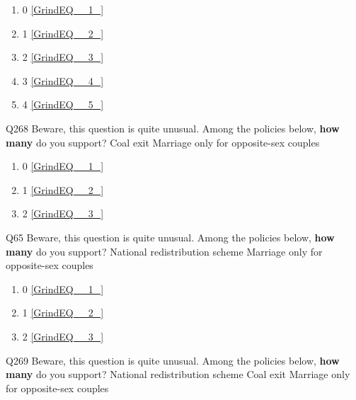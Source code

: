 \documentclass{article} %
\begin{document}
\begin{enumerate}
\item  0  \eqref{GrindEQ__1_} 

\item  1  \eqref{GrindEQ__2_} 

\item  2  \eqref{GrindEQ__3_} 

\item  3  \eqref{GrindEQ__4_} 

\item  4  \eqref{GrindEQ__5_} 
\end{enumerate}

\noindent 

\noindent 

\noindent 

\noindent Q268 Beware, this question is quite unusual. Among the policies below, \textbf{how many} do you support?   Coal exit  Marriage only for opposite-sex couples 

\begin{enumerate}
\item  0  \eqref{GrindEQ__1_} 

\item  1  \eqref{GrindEQ__2_} 

\item  2  \eqref{GrindEQ__3_} 
\end{enumerate}

\noindent 

\noindent 

\noindent 

\noindent Q65 Beware, this question is quite unusual. Among the policies below, \textbf{how many} do you support?   National redistribution scheme  Marriage only for opposite-sex couples 

\begin{enumerate}
\item  0  \eqref{GrindEQ__1_} 

\item  1  \eqref{GrindEQ__2_} 

\item  2  \eqref{GrindEQ__3_} 
\end{enumerate}

\noindent 

\noindent 

\noindent 

\noindent Q269 Beware, this question is quite unusual. Among the policies below, \textbf{how many }do you support?   National redistribution scheme  Coal exit  Marriage only for opposite-sex couples 
\end{document}
